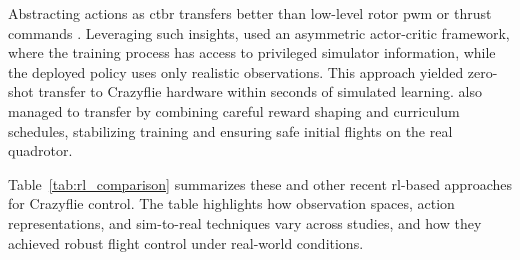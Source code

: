 Abstracting actions as \gls{ctbr} transfers better than low-level rotor \gls{pwm} or thrust commands \cite{kaufmann_benchmark_2022}. Leveraging such insights, \cite{Eschmann2024} used an asymmetric actor-critic framework, where the training process has access to privileged simulator information, while the deployed policy uses only realistic observations. This approach yielded zero-shot transfer to Crazyflie hardware within seconds of simulated learning. \cite{chen_what_2024} also managed to transfer by combining careful reward shaping and curriculum schedules, stabilizing training and ensuring safe initial flights on the real quadrotor.

Table~\ref{tab:rl_comparison} summarizes these and other recent \gls{rl}-based approaches for Crazyflie control. The table highlights how observation spaces, action representations, and sim-to-real techniques vary across studies, and how they achieved robust flight control under real-world conditions.
